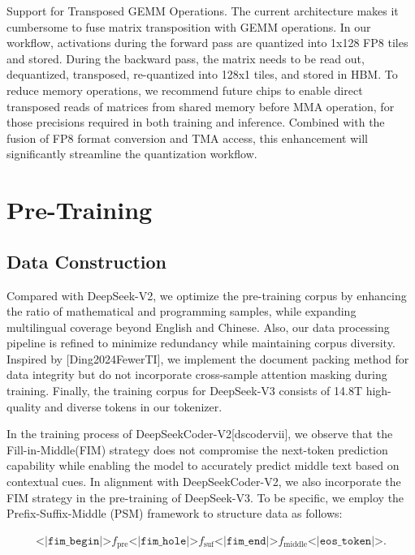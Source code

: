 \documentclass[11pt,a4paper]{article}
\begin{document}
Support for Transposed GEMM Operations.
The current architecture makes it cumbersome to fuse matrix transposition with GEMM operations. 
In our workflow, activations during the forward pass are quantized into 1x128 FP8 tiles and stored. 
During the backward pass, the matrix needs to be read out, dequantized, transposed, re-quantized into 128x1 tiles, and stored in HBM. 
To reduce memory operations, we recommend future chips to enable direct transposed reads of matrices from shared memory before MMA operation, for those precisions required in both training and inference. Combined with the fusion of FP8 format conversion and TMA access, this enhancement will significantly streamline the quantization workflow.

\section{Pre-Training}

\subsection{Data Construction}

Compared with DeepSeek-V2, we optimize the pre-training corpus by enhancing the ratio of mathematical and programming samples, while expanding multilingual coverage beyond English and Chinese. 
Also, our data processing pipeline is refined to minimize redundancy while maintaining corpus diversity. 
Inspired by [Ding2024FewerTI], we implement the document packing method for data integrity but do not incorporate cross-sample attention masking during training. 
Finally, the training corpus for DeepSeek-V3 consists of 14.8T high-quality and diverse tokens in our tokenizer.

In the training process of DeepSeekCoder-V2[dscodervii], we observe that the Fill-in-Middle(FIM) strategy does not compromise the next-token prediction capability while enabling the model to accurately predict middle text based on contextual cues. 
In alignment with DeepSeekCoder-V2, we also incorporate the FIM strategy in the pre-training of DeepSeek-V3. 
To be specific, we employ the Prefix-Suffix-Middle (PSM) framework to structure data as follows:

$$\begin{align}
\texttt{<|fim\_begin|>}f_{\text{pre}}\texttt{<|fim\_hole|>}f_{\text{suf}}\texttt{<|fim\_end|>}f_{\text{middle}}\texttt{<|eos\_token|>} . \nonumber
\end{align}$$
\end{document}
